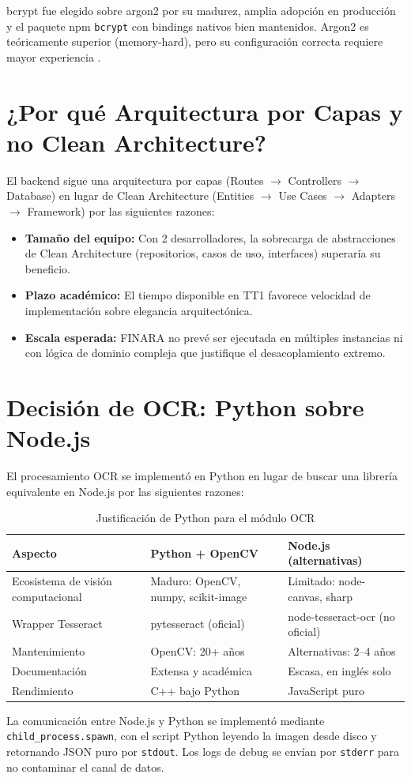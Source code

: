 bcrypt fue elegido sobre argon2 por su madurez, amplia adopción en producción y el paquete npm \texttt{bcrypt} con bindings nativos bien mantenidos. Argon2 es teóricamente superior (memory-hard), pero su configuración correcta requiere mayor experiencia \cite{bcrypt_npm}.

\section{¿Por qué Arquitectura por Capas y no Clean Architecture?}

El backend sigue una arquitectura por capas (Routes $\to$ Controllers $\to$ Database) en lugar de Clean Architecture (Entities $\to$ Use Cases $\to$ Adapters $\to$ Framework) \cite{martin_clean_arch} por las siguientes razones:

\begin{itemize}[leftmargin=1.5cm]
  \item \textbf{Tamaño del equipo:} Con 2 desarrolladores, la sobrecarga de abstracciones de Clean Architecture (repositorios, casos de uso, interfaces) superaría su beneficio.
  \item \textbf{Plazo académico:} El tiempo disponible en TT1 favorece velocidad de implementación sobre elegancia arquitectónica.
  \item \textbf{Escala esperada:} FINARA no prevé ser ejecutada en múltiples instancias ni con lógica de dominio compleja que justifique el desacoplamiento extremo.
\end{itemize}

\section{Decisión de OCR: Python sobre Node.js}

El procesamiento OCR se implementó en Python en lugar de buscar una librería equivalente en Node.js por las siguientes razones:

\begin{longtable}{p{4cm} p{5.5cm} p{4.5cm}}
  \caption{Justificación de Python para el módulo OCR}
  \label{tab:ocr-decision} \\
  \toprule
  \textbf{Aspecto} & \textbf{Python + OpenCV} & \textbf{Node.js (alternativas)} \\
  \midrule
  Ecosistema de visión computacional & Maduro: OpenCV, numpy, scikit-image & Limitado: node-canvas, sharp \\
  Wrapper Tesseract  & pytesseract (oficial) & node-tesseract-ocr (no oficial) \\
  Mantenimiento      & OpenCV: 20+ años      & Alternativas: 2--4 años \\
  Documentación      & Extensa y académica   & Escasa, en inglés solo \\
  Rendimiento        & C++ bajo Python       & JavaScript puro \\
  \bottomrule
\end{longtable}

La comunicación entre Node.js y Python se implementó mediante \texttt{child\_process.spawn}, con el script Python leyendo la imagen desde disco y retornando JSON puro por \texttt{stdout}. Los logs de debug se envían por \texttt{stderr} para no contaminar el canal de datos.
